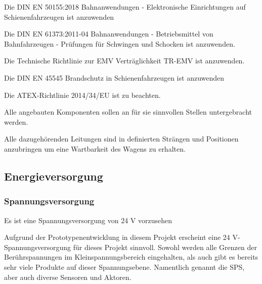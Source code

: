 \begin{feat}
Die \acrshort{DIN} \acrshort{EN} 50155:2018 Bahnanwendungen - Elektronische Einrichtungen auf Schienenfahrzeugen ist anzuwenden
\end{feat}
\begin{feat}
Die \acrshort{DIN} \acrshort{EN} 61373:2011-04 Bahnanwendungen - Betriebsmittel von Bahnfahrzeugen - Prüfungen für Schwingen und Schocken ist anzuwenden.
\end{feat}
\begin{feat}
Die Technische Richtlinie zur EMV Verträglichkeit TR-EMV ist anzuwenden.
\end{feat}
\begin{feat}
Die \acrshort{DIN} \acrshort{EN} 45545 Brandschutz in Schienenfahrzeugen ist anzuwenden
\end{feat}
\begin{feat}
Die ATEX-Richtlinie 2014/34/EU ist zu beachten.
\end{feat}
\begin{feat}
Alle angebauten Komponenten sollen an für sie sinnvollen Stellen untergebracht werden.
\end{feat}
\begin{rem}[zu Anf. 09]
Alle dazugehörenden Leitungen sind in definierten Strängen und Positionen anzubringen um eine Wartbarkeit des Wagens zu erhalten.
\end{rem}

\subsection{Energieversorgung}\label{sec:EV}
\subsubsection{Spannungsversorgung}
\begin{feat}
Es ist eine Spannungsversorgung von 24 V vorzusehen
\end{feat}
\begin{rem}[zu Anf. 10]
Aufgrund der Prototypenentwicklung in diesem Projekt erscheint eine 24 V-Spannungsversorgung für dieses Projekt sinnvoll. Sowohl werden alle Grenzen der Berührspannungen im Kleinspannungsbereich eingehalten, als auch gibt es bereits sehr viele Produkte auf dieser Spannungsebene. Namentlich genannt die SPS, aber auch diverse Sensoren und Aktoren.
\end{rem}

